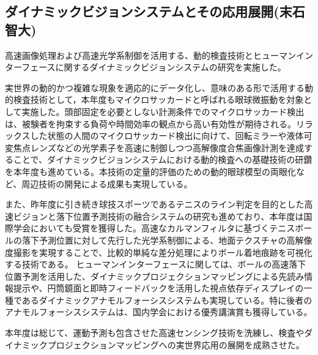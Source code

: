 \subsection{ダイナミックビジョンシステムとその応用展開(末石 智大)}

高速画像処理および高速光学系制御を活用する、動的検査技術とヒューマンインターフェースに関するダイナミックビジョンシステムの研究を実施した。

実世界の動的かつ複雑な現象を適応的にデータ化し、意味のある形で活用する動的検査技術として，本年度もマイクロサッカードと呼ばれる眼球微振動を対象として実施した。頭部固定を必要としない計測条件でのマイクロサッカード検出は、被験者を拘束する負荷や時間効率の観点から高い有効性が期待される。リラックスした状態の人間のマイクロサッカード検出に向けて、回転ミラーや液体可変焦点レンズなどの光学素子を高速に制御しつつ高解像度合焦画像計測を達成することで、ダイナミックビジョンシステムにおける動的検査への基礎技術の研鑽を本年度も進めている。本技術の定量的評価のための動的眼球模型の両眼化など、周辺技術の開発による成果も実現している。

また、昨年度に引き続き球技スポーツであるテニスのライン判定を目的とした高速ビジョンと落下位置予測技術の融合システムの研究も進めており、本年度は国際学会においても受賞を獲得した。高速なカルマンフィルタに基づくテニスボールの落下予測位置に対して先行した光学系制御による、地面テクスチャの高解像度撮影を実現することで、比較的単純な差分処理によりボール着地痕跡を可視化する技術である。
ヒューマンインターフェースに関しては、ボールの高速落下位置予測を活用した、ダイナミックプロジェクションマッピングによる先読み情報提示や、円筒鏡面と即時フィードバックを活用した視点依存ディスプレイの一種であるダイナミックアナモルフォーシスシステムも実現している。特に後者のアナモルフォーシスシステムは、国内学会における優秀講演賞も獲得している。

本年度は総じて、運動予測も包含させた高速センシング技術を洗練し、検査やダイナミックプロジェクションマッピングへの実世界応用の展開を成熟させた。
